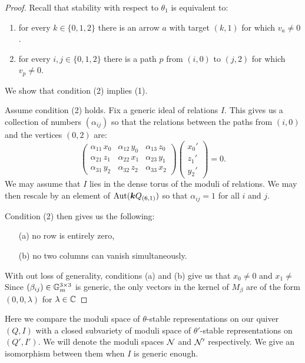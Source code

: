 \documentclass{amsart}
\theoremstyle{definition}
\begin{document}
\begin{proof}
Recall that stability with respect to $\theta_1$ is equivalent to:
\begin{enumerate}
    \item for every $k \in \{0,1,2\}$ there is an arrow $a$ with target $(k,1)$ for which $v_a \neq 0$. 
    \item for every $i,j \in \{0,1,2\}$ there is a path $p$ from $(i,0)$ to $(j,2)$ for which $v_p\neq 0$.
\end{enumerate}
We show that condition (2) implies (1).

Assume condition (2) holds.
Fix a generic ideal of relations $I$.
This gives us a collection of numbers $(\alpha_{ij})$ so that the relations between the paths from $(i,0)$ and the vertices $(0,2)$ are:
\begin{equation}\label{eq:z}
    \begin{pmatrix}
    \alpha_{11}\, x_0 & \alpha_{12}\, y_0 & \alpha_{13}\, z_0 \\
    \alpha_{21}\, z_1 & \alpha_{22}\, x_1 & \alpha_{23}\, y_1 \\
    \alpha_{31}\, y_2 & \alpha_{32}\, z_2 & \alpha_{33}\, x_2
\end{pmatrix} \begin{pmatrix}
    x_0' \\ z_1' \\ y_2'
\end{pmatrix} =0.
\end{equation}
We may assume that $I$ lies in the dense torus of the moduli of relations.
We may then rescale by an element of $\text{Aut}({\boldsymbol{k}} Q_{(6,1)})$ so that $\alpha_{ij}=1$ for all $i$ and $j$.

Condition (2) then gives us the following:
\begin{enumerate}
    \item[(a)] no row is entirely zero,
    \item[(b)] no two columns can vanish simultaneously.
\end{enumerate}
With out loss of generality, conditions (a) and (b) give us that $x_0 \neq 0$ and $x_1 \neq $
Since $(\beta_{ij}) \in \mathbb{G}_m^{3 \times 3}$ is generic, the only vectors in the kernel of $M_\beta$ are of the form $(0,0,\lambda)$ for $\lambda \in \mathbb{C}$
\end{proof}

Here we compare the moduli space of $\theta$-stable representations on our quiver $(Q,I)$ with a closed subvariety of moduli space of $\theta'$-stable representations on $(Q',I')$.
We will denote the moduli spaces $\mathcal{N}$ and $\mathcal{N}'$ respectively.
We give an isomorphism between them when $I$ is generic enough.
\end{document}
